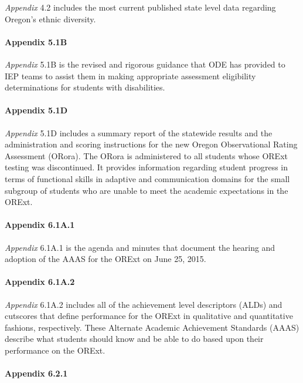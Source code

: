 \documentclass[]{article}
\let\oldparagraph\paragraph
\renewcommand{\paragraph}[1]{\oldparagraph{#1}\mbox{}}
\begin{document}
\emph{Appendix} 4.2 includes the most current published state level data
regarding Oregon's ethnic diversity.

\hypertarget{appendix-5.1b}{%
\paragraph{Appendix 5.1B}\label{appendix-5.1b}}

\emph{Appendix} 5.1B is the revised and rigorous guidance that ODE has
provided to IEP teams to assist them in making appropriate assessment
eligibility determinations for students with disabilities.

\hypertarget{appendix-5.1d}{%
\paragraph{Appendix 5.1D}\label{appendix-5.1d}}

\emph{Appendix} 5.1D includes a summary report of the statewide results
and the administration and scoring instructions for the new Oregon
Observational Rating Assessment (ORora). The ORora is administered to
all students whose ORExt testing was discontinued. It provides
information regarding student progress in terms of functional skills in
adaptive and communication domains for the small subgroup of students
who are unable to meet the academic expectations in the ORExt.

\hypertarget{appendix-6.1a.1}{%
\paragraph{Appendix 6.1A.1}\label{appendix-6.1a.1}}

\emph{Appendix} 6.1A.1 is the agenda and minutes that document the
hearing and adoption of the AAAS for the ORExt on June 25, 2015.

\hypertarget{appendix-6.1a.2}{%
\paragraph{Appendix 6.1A.2}\label{appendix-6.1a.2}}

\emph{Appendix} 6.1A.2 includes all of the achievement level descriptors
(ALDs) and cutscores that define performance for the ORExt in
qualitative and quantitative fashions, respectively. These Alternate
Academic Achievement Standards (AAAS) describe what students should know
and be able to do based upon their performance on the ORExt.

\hypertarget{appendix-6.2.1}{%
\paragraph{Appendix 6.2.1}\label{appendix-6.2.1}}
\end{document}
